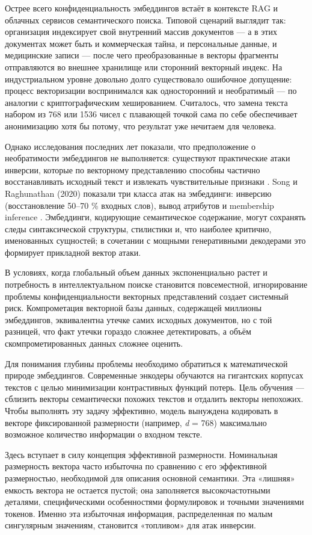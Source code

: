 \documentclass[a4paper, 12pt, oneside, openany]{article}
\begin{document}
Острее всего конфиденциальность эмбеддингов встаёт в контексте RAG и облачных сервисов семантического поиска. Типовой сценарий выглядит так: организация индексирует свой внутренний массив документов — а в этих документах может быть и коммерческая тайна, и персональные данные, и медицинские записи — после чего преобразованные в векторы фрагменты отправляются во внешнее хранилище или сторонний векторный индекс. На индустриальном уровне довольно долго существовало ошибочное допущение: процесс векторизации воспринимался как односторонний и необратимый — по аналогии с криптографическим хешированием. Считалось, что замена текста набором из 768 или 1536 чисел с плавающей точкой сама по себе обеспечивает анонимизацию хотя бы потому, что результат уже нечитаем для человека.

Однако исследования последних лет показали, что предположение о необратимости эмбеддингов не выполняется: существуют практические атаки инверсии, которые по векторному представлению способны частично восстанавливать исходный текст и извлекать чувствительные признаки \cite{ref5,ref6,ref7,ref8}. Song и Raghunathan (2020) показали три класса атак на эмбеддинги: инверсию (восстановление 50--70 \% входных слов), вывод атрибутов и membership inference \cite{ref42}. Эмбеддинги, кодирующие семантическое содержание, могут сохранять следы синтаксической структуры, стилистики и, что наиболее критично, именованных сущностей; в сочетании с мощными генеративными декодерами это формирует прикладной вектор атаки.

В условиях, когда глобальный объем данных экспоненциально растет и потребность в интеллектуальном поиске становится повсеместной, игнорирование проблемы конфиденциальности векторных представлений создает системный риск. Компрометация векторной базы данных, содержащей миллионы эмбеддингов, эквивалентна утечке самих исходных документов, но с той разницей, что факт утечки гораздо сложнее детектировать, а объём скомпрометированных данных сложнее оценить.

Для понимания глубины проблемы необходимо обратиться к математической природе эмбеддингов. Современные энкодеры обучаются на гигантских корпусах текстов с целью минимизации контрастивных функций потерь. Цель обучения --- сблизить векторы семантически похожих текстов и отдалить векторы непохожих. Чтобы выполнять эту задачу эффективно, модель вынуждена кодировать в векторе фиксированной размерности (например, \emph{d} = 768) максимально возможное количество информации о входном тексте.

Здесь вступает в силу концепция эффективной размерности. Номинальная размерность вектора часто избыточна по сравнению с его эффективной размерностью, необходимой для описания основной семантики. Эта «лишняя» емкость вектора не остается пустой; она заполняется высокочастотными деталями, специфическими особенностями формулировок и точными значениями токенов. Именно эта избыточная информация, распределенная по малым сингулярным значениям, становится «топливом» для атак инверсии.
\end{document}

